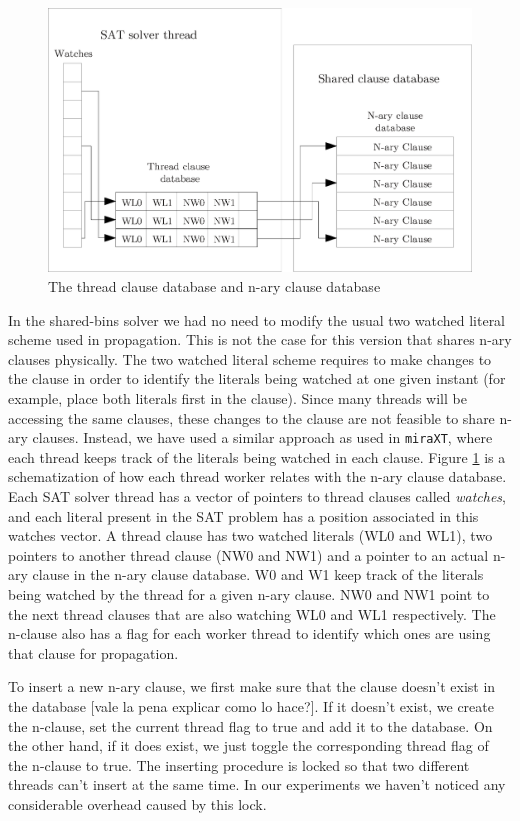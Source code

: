 \begin{figure}[tp]
  \centering
  \includegraphics[scale=0.6]{AzuDICI_design}
  \caption{The thread clause database and n-ary clause database}
  \label{fig:azu design}
\end{figure}

In the shared-bins solver we had no need to modify the usual two 
watched literal scheme used in propagation. This is not
the case for this version that shares n-ary clauses physically. 
The two watched literal scheme requires to make changes to the 
clause in order to identify 
the literals being watched at one given instant (for example, place
both literals first in the clause). Since many threads will be
accessing the same clauses, these changes to the clause are not
feasible to share n-ary clauses. Instead, we have used a similar 
approach as used in
{\tt miraXT}, where each thread keeps track of the literals being
watched in each clause. Figure \ref{fig:azu design} is a
schematization of how each thread worker relates with the n-ary
clause database. Each SAT solver thread has a vector of pointers
to thread clauses called \textit{watches}, and each literal present
in the SAT problem has a position associated in this watches vector.
A thread clause has two watched literals (WL0 and WL1), two
pointers to another thread clause (NW0 and NW1) and a pointer to
an actual n-ary clause in the n-ary clause database. W0 and W1 keep
track of the literals being watched by the thread for a given n-ary
clause. NW0 and NW1 point to the next thread clauses that are also 
watching WL0 and WL1 respectively. The n-clause also has a flag for 
each worker thread to identify which ones are using that clause 
for propagation.

To insert a new n-ary clause, we first make sure that the clause 
doesn't exist in the database [vale la pena explicar como lo hace?]. If it 
doesn't exist, we create the n-clause, set the current thread 
flag to true and add it to the database. 
On the other hand, if it does exist, we just toggle the 
corresponding thread flag of the n-clause to true. The inserting 
procedure is locked so that two different threads can't insert
at the same time. In our experiments we haven't noticed any 
considerable overhead caused by this lock.

